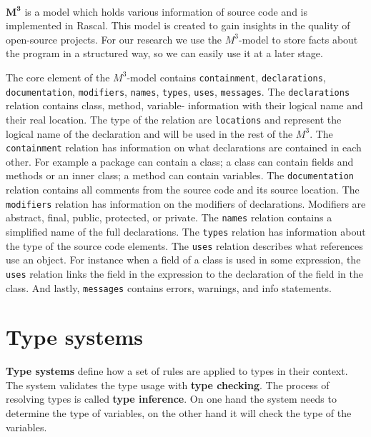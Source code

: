 \documentclass[../main.tex]{subfiles}
\begin{document}
    \paragraph{}
    $\pmb{M^3}$\cite{Ana:13} is a model which holds various information of source code and is implemented in Rascal.
    This model is created to gain insights in the quality of open-source projects.
    For our research we use the $M^3$-model to store facts about the program in a structured way, so we can easily use it at a later stage.
    
    The core element of the $M^3$-model contains \texttt{containment}, \texttt{declarations}, \texttt{documentation}, \texttt{modifiers}, \texttt{names}, \texttt{types}, \texttt{uses}, \texttt{messages}.
    The \texttt{declarations} relation contains class, method, variable- information with their logical name and their real location. The type of the relation are \texttt{locations} and represent the logical name of the declaration and will be used in the rest of the $M^3$.
    The \texttt{containment} relation has information on what declarations are contained in each other. For example a package can contain a class; a class can contain fields and methods or an inner class; a method can contain variables.    
    The \texttt{documentation} relation contains all comments from the source code and its source location.
    The \texttt{modifiers} relation has information on the modifiers of declarations. Modifiers are abstract, final, public, protected, or private.
    The \texttt{names} relation contains a simplified name of the full declarations.
    The \texttt{types} relation has information about the type of the source code elements.
    The \texttt{uses} relation describes what references use an object. For instance when a field of a class is used in some expression, the \texttt{uses} relation links the field in the expression to the declaration of the field in the class.
    And lastly, \texttt{messages} contains errors, warnings, and info statements.
    
    \section{Type systems}\label{sec:background_type-system}
    \textbf{Type systems} define how a set of rules are applied to types in their context.
    The system validates the type usage with \textbf{type checking}.
    The process of resolving types is called \textbf{type inference}.
    On one hand the system needs to determine the type of variables, on the other hand it will check the type of the variables.
    
\end{document}
